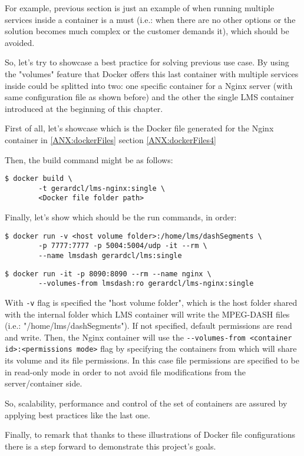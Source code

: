 For example, previous section is just an example of when running multiple services inside a container is a must (i.e.: when there are no other options or the solution becomes much complex or the customer demands it), which should be avoided.

So, let's try to showcase a best practice for solving previous use case. By using the "volumes" feature that Docker offers this last container with multiple services inside could be splitted into two: one specific container for a Nginx server (with same configuration file as shown before) and the other the single LMS container introduced at the beginning of this chapter. 

First of all, let's showcase which is the Docker file generated for the Nginx container in
\ref{ANX:dockerFiles} section \ref{ANX:dockerFiles4}

Then, the build command might be as follows:

\begin{verbatim}
$ docker build \
		-t gerardcl/lms-nginx:single \
		<Docker file folder path>
\end{verbatim}

Finally, let's show which should be the run commands, in order:

\begin{verbatim}
$ docker run -v <host volume folder>:/home/lms/dashSegments \
		-p 7777:7777 -p 5004:5004/udp -it --rm \
		--name lmsdash gerardcl/lms:single
\end{verbatim}

\begin{verbatim}
$ docker run -it -p 8090:8090 --rm --name nginx \
		--volumes-from lmsdash:ro gerardcl/lms-nginx:single 
\end{verbatim}

With \verb|-v| flag is specified the "host volume folder", which is the host folder shared with the internal folder which LMS container will write the MPEG-DASH files (i.e.: "/home/lms/dashSegments"). If not specified, default permissions are read and write. Then, the Nginx container will use the \verb|--volumes-from <container id>:<permissions mode>| flag by specifying the containers from which will share its volume and its file permissions. In this case file permissions are specified to be in read-only mode in order to not avoid file modifications from the server/container side.  
 
So, scalability, performance and control of the set of containers are assured by applying best practices like the last one.

Finally, to remark that thanks to these illustrations of Docker file configurations there is a step forward to demonstrate this project's goals.
